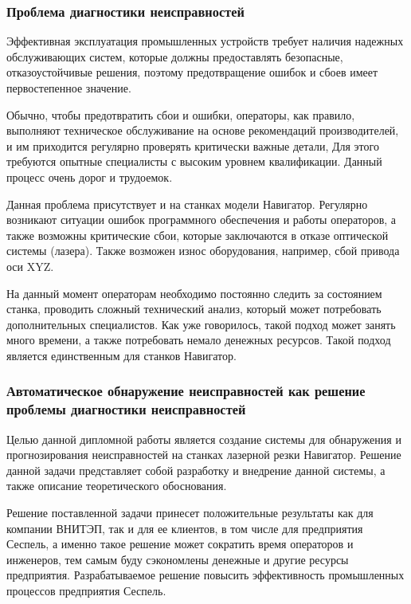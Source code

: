 \subsubsection{Проблема диагностики неисправностей}

Эффективная эксплуатация промышленных устройств
требует наличия надежных обслуживающих систем,
которые должны предоставлять безопасные, отказоустойчивые решения,
поэтому предотвращение ошибок и сбоев имеет первостепенное значение.

Обычно, чтобы предотвратить сбои и ошибки, операторы,
как правило, выполняют техническое обслуживание 
на основе рекомендаций производителей, 
и им приходится регулярно проверять критически важные детали,
Для этого требуются опытные специалисты с высоким уровнем квалификации.
Данный процесс очень дорог и трудоемок.

Данная проблема присутствует и на станках модели Навигатор.
Регулярно возникают ситуации ошибок программного обеспечения
и работы операторов, а также возможны критические сбои,
которые заключаются в отказе оптической системы (лазера).
Также возможен износ оборудования,
например, сбой привода оси XYZ.

На данный момент операторам необходимо постоянно следить за состоянием
станка, проводить сложный технический анализ,
который может потребовать дополнительных специалистов.
Как уже говорилось, такой подход может занять много времени,
а также потребовать немало денежных ресурсов.
Такой подход является единственным для станков Навигатор.


\subsubsection{Автоматическое обнаружение неисправностей как решение проблемы диагностики неисправностей}

Целью данной дипломной работы является создание системы
для обнаружения и прогнозирования неисправностей на станках лазерной резки Навигатор.
Решение данной задачи представляет собой
разработку и внедрение данной системы,
а также описание теоретического обоснования.

Решение поставленной задачи принесет
положительные результаты как для компании ВНИТЭП,
так и для ее клиентов, в том числе для предприятия Сеспель,
а именно такое решение может сократить
время операторов и инженеров,
тем самым буду сэкономлены денежные и другие ресурсы
предприятия.
Разрабатываемое решение повысить эффективность
промышленных процессов предприятия Сеспель.

